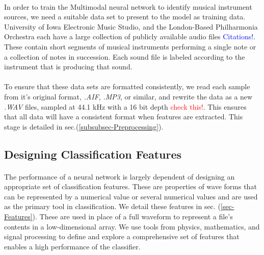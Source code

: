 \documentclass[12pt,letterpaper]{article}
\begin{document}
\paragraph*{}In order to train the Multimodal neural network to identify musical instrument sources, we need a suitable data set to present to the model as training data. University of Iowa Electronic Music Studio, and the London-Based Philharmonia Orchestra each have a large collection of publicly available audio files \textcolor{blue}{Citations!}. These contain short segments of musical instruments performing a single note or a collection of notes in succession. Each sound file is labeled according to the instrument that is producing that sound.

\paragraph*{}To ensure that these data sets are formatted consistently, we read each sample from it's original format, \textit{.AIF}, \textit{.MP3}, or similar, and rewrite the data as a new \textit{.WAV} files, sampled at 44.1 kHz with a 16 bit depth \textcolor{red}{check this!}. This ensures that all data will have a consistent format when features are extracted. This stage is detailed in sec.(\ref{subsubsec-Preprocessing}).

\subsection{Designing Classification Features}

\paragraph*{}The performance of a neural network is largely dependent of designing an appropriate set of classification features. These are properties of wave forms that can be represented by a numerical value or several numerical values and are used as the primary tool in classification. We detail these features in sec. (\ref{sec-Features}). These are used in place of a full waveform to represent a file's contents in a low-dimensional array. We use tools from physics, mathematics, and signal processing to define and explore a comprehensive set of features that enables a high performance of the classifier. 

\end{document}
